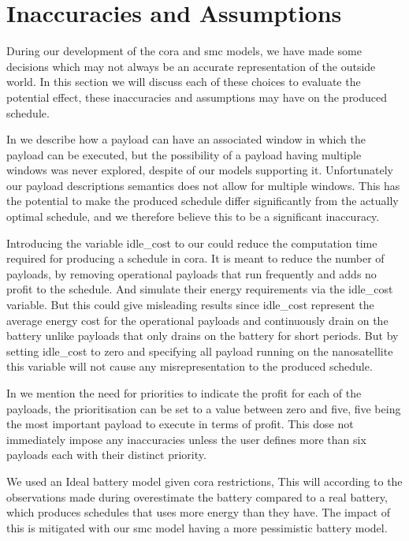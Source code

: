 \section{Inaccuracies and Assumptions}\label{sec:in_and_ass}
During our development of the \gls{cora} and \gls{smc} models, we have made some decisions which may not always be an accurate representation of the outside world. In this section we will discuss each of these choices to evaluate the potential effect, these inaccuracies and assumptions may have on the produced schedule.

In  we describe how a payload can have an associated window in which the payload can be executed, but the possibility of a payload having multiple windows was never explored, despite of our models supporting it. Unfortunately our payload descriptions semantics does not allow for multiple windows. This has the potential to make the produced schedule differ significantly from the actually optimal schedule, and we therefore believe this to be a significant inaccuracy.

Introducing the variable idle\_cost to our  could reduce the computation time required for producing a schedule in \gls{cora}. It is meant to reduce the number of payloads, by removing operational payloads that run frequently and adds no profit to the schedule. And simulate their energy requirements via the idle\_cost variable. But this could give misleading results since idle\_cost represent the average energy cost for the operational payloads and continuously drain on the battery unlike payloads that only drains on the battery for short periods. But by setting idle\_cost to zero and specifying all payload running on the nanosatellite this variable will not cause any misrepresentation to the produced schedule.

In  we mention the need for priorities to indicate the profit for each of the payloads, the prioritisation can be set to a value between zero and five, five being the most important payload to execute in terms of profit. This dose not immediately impose any inaccuracies unless the user defines more than six payloads each with their distinct priority.

We used an Ideal battery model given \gls{cora} restrictions, This will according to the observations made during  overestimate the battery compared to a real battery, which produces schedules that uses more energy than they have. The impact of this is mitigated with our \gls{smc} model having a more pessimistic battery model.

